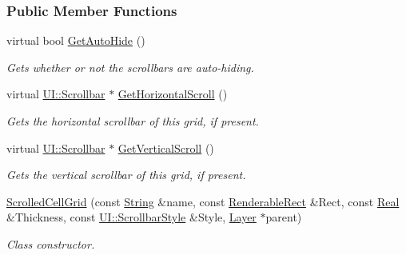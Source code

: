 \subsubsection*{Public Member Functions}
\begin{DoxyCompactItemize}
\item 
virtual bool \hyperlink{classMezzanine_1_1UI_1_1ScrolledCellGrid_ab631edc44667875821775d7a91ce6b27}{GetAutoHide} ()
\begin{DoxyCompactList}\small\item\em Gets whether or not the scrollbars are auto-\/hiding. \item\end{DoxyCompactList}\item 
virtual \hyperlink{classMezzanine_1_1UI_1_1Scrollbar}{UI::Scrollbar} $\ast$ \hyperlink{classMezzanine_1_1UI_1_1ScrolledCellGrid_ac50f4843ed5e9e65fdee56451341adcc}{GetHorizontalScroll} ()
\begin{DoxyCompactList}\small\item\em Gets the horizontal scrollbar of this grid, if present. \item\end{DoxyCompactList}\item 
virtual \hyperlink{classMezzanine_1_1UI_1_1Scrollbar}{UI::Scrollbar} $\ast$ \hyperlink{classMezzanine_1_1UI_1_1ScrolledCellGrid_a15cb0413fb4297936ad08e6334532d02}{GetVerticalScroll} ()
\begin{DoxyCompactList}\small\item\em Gets the vertical scrollbar of this grid, if present. \item\end{DoxyCompactList}\item 
\hyperlink{classMezzanine_1_1UI_1_1ScrolledCellGrid_aa8747a6e983ad69e6c7144f8c62f607e}{ScrolledCellGrid} (const \hyperlink{namespaceMezzanine_acf9fcc130e6ebf08e3d8491aebcf1c86}{String} \&name, const \hyperlink{structMezzanine_1_1UI_1_1RenderableRect}{RenderableRect} \&Rect, const \hyperlink{namespaceMezzanine_a726731b1a7df72bf3583e4a97282c6f6}{Real} \&Thickness, const \hyperlink{namespaceMezzanine_1_1UI_a5998a9bf372a7e92605c0c461736e763}{UI::ScrollbarStyle} \&Style, \hyperlink{classMezzanine_1_1UI_1_1Layer}{Layer} $\ast$parent)
\begin{DoxyCompactList}\small\item\em Class constructor. \item\end{DoxyCompactList}\item 

\end{DoxyCompactItemize}

